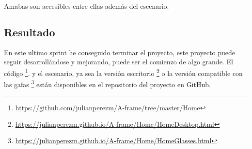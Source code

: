 \documentclass[a4paper, 12pt]{book}
\begin{document}
Amabas son accesibles entre ellas además del escenario.

\subsection{Resultado}

En este ultimo sprint he conseguido terminar el proyecto, este proyecto puede seguir desarrollándose y mejorando, puede ser el comienzo de algo grande. El código \footnote{\url{https://github.com/julianperezm/A-frame/tree/master/Home}}.  y el escenario, ya sea la versión escritorio \footnote{\url{https://julianperezm.github.io/A-frame/Home/HomeDesktop.html}} o la versión compatible con las gafas \footnote{\url{https://julianperezm.github.io/A-frame/Home/HomeGlasses.html}} están disponibles en el repositorio del proyecto en GitHub.
\end{document}
